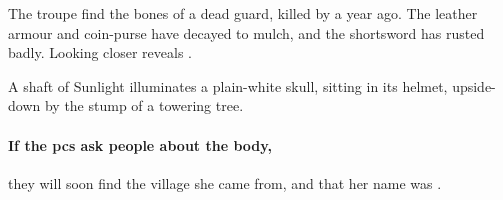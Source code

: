 
The troupe find the bones of a dead \gls{guard}, killed by  a year ago.
The leather armour and coin-purse have decayed to mulch, and the shortsword has rusted badly.
Looking closer reveals \lootSmall.

\begin{boxtext}
  A shaft of Sunlight illuminates a plain-white skull, sitting in its helmet, upside-down by the stump of a towering tree.
\end{boxtext}

\paragraph{If the \glspl{pc} ask people about the body,}
they will soon find the \gls{village} she came from, and that her name was \composeHumanName.
